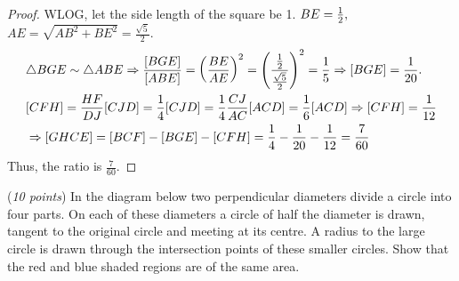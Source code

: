 \documentclass{article}
\begin{document}
\begin{proof}
    WLOG, let the side length of the square be 1. $BE = \frac{1}{2},$ $AE = \sqrt{AB^2+BE^2} = \frac{\sqrt{5}}{2}.$
    \[
        \begin{aligned}
            &\triangle BGE \sim \triangle ABE \Rightarrow \frac{[BGE]}{[ABE]} = \left( \frac{BE}{AE} \right)^2 
            = \left( \frac{\frac{1}{2}}{\frac{\sqrt{5}}{2}} \right)^2 = \frac{1}{5} \Rightarrow [BGE] = \frac{1}{20}.\\
            &[CFH] = \frac{HF}{DJ}[CJD] = \frac{1}{4}[CJD] = \frac{1}{4}\frac{CJ}{AC} [ACD] = \frac{1}{6}[ACD] \Rightarrow [CFH] = \frac{1}{12}\\
            &\Rightarrow [GHCE] = [BCF] - [BGE] - [CFH] = \frac{1}{4} - \frac{1}{20} - \frac{1}{12} = \frac{7}{60}
        \end{aligned}
    \]
    Thus, the ratio is $\frac{7}{60}.$
\end{proof}

\newpage

\begin{example*}[Example 20]
    (\textit{10 points}) In the diagram below two perpendicular diameters divide a circle into four parts.
    On each of these diameters a circle of half the diameter is drawn, tangent to the original circle and meeting at its centre.
    A radius to the large circle is drawn through the intersection points of these smaller circles.
    Show that the red and blue shaded regions are of the same area.
\end{example*}
\end{document}
